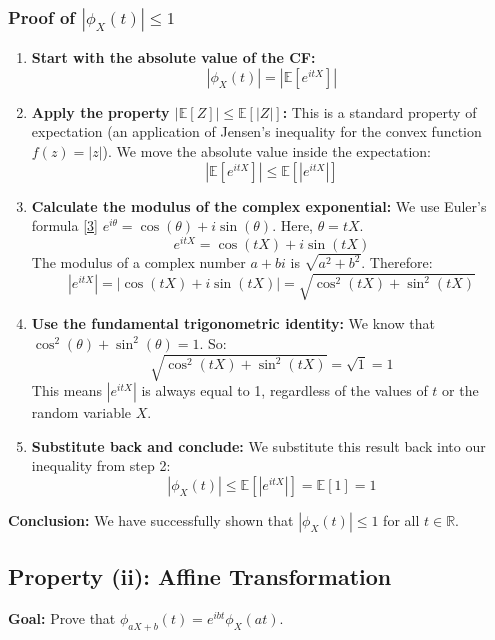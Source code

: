 \documentclass[11pt,a4paper]{article}
\begin{document}
\subsubsection{Proof of $|\phi_X(t)| \leq 1$}
\begin{enumerate}
    \item \textbf{Start with the absolute value of the CF:}
    \[ |\phi_X(t)| = |\mathbb{E}[e^{itX}]| \]
    \item \textbf{Apply the property $|\mathbb{E}[Z]| \leq \mathbb{E}[|Z|]$:} This is a standard property of expectation (an application of Jensen's inequality for the convex function $f(z)=|z|$). We move the absolute value inside the expectation:
    \[ |\mathbb{E}[e^{itX}]| \leq \mathbb{E}[|e^{itX}|] \]
    \item \textbf{Calculate the modulus of the complex exponential:} We use Euler's formula \hyperlink{note3}{[3]} $e^{i\theta} = \cos(\theta) + i\sin(\theta)$. Here, $\theta = tX$.
    \[ e^{itX} = \cos(tX) + i\sin(tX) \]
    The modulus of a complex number $a+bi$ is $\sqrt{a^2 + b^2}$. Therefore:
    \[ |e^{itX}| = |\cos(tX) + i\sin(tX)| = \sqrt{\cos^2(tX) + \sin^2(tX)} \]
    \item \textbf{Use the fundamental trigonometric identity:} We know that $\cos^2(\theta) + \sin^2(\theta) = 1$. So:
    \[ \sqrt{\cos^2(tX) + \sin^2(tX)} = \sqrt{1} = 1 \]
    This means $|e^{itX}|$ is always equal to 1, regardless of the values of $t$ or the random variable $X$.
    \item \textbf{Substitute back and conclude:} We substitute this result back into our inequality from step 2:
    \[ |\phi_X(t)| \leq \mathbb{E}[|e^{itX}|] = \mathbb{E}[1] = 1 \]
\end{enumerate}
\textbf{Conclusion:} We have successfully shown that $|\phi_X(t)| \leq 1$ for all $t \in \mathbb{R}$.

\subsection{Property (ii): Affine Transformation}
\textbf{Goal:} Prove that $\phi_{aX+b}(t) = e^{ibt}\phi_X(at)$.
\end{document}
